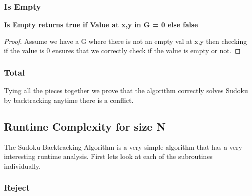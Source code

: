\documentclass{sig-alternate}
\begin{document}
\subsubsection{Is Empty}
\textbf{Is Empty returns true if Value at x,y in G = 0 else false}
\begin{proof}
Assume we have a G where there is not an empty val at x,y then checking if the value is 0 ensures that we correctly check if the value is empty or not. 
\end{proof}

\subsubsection{Total}
Tying all the pieces together we prove that the algorithm correctly solves Sudoku by backtracking anytime there is a conflict. 

\subsection{Runtime Complexity for size N}
The Sudoku Backtracking Algorithm is a very simple algorithm that has a very interesting runtime analysis. First lets look at each of the subroutines individually. 

\subsubsection{Reject}
\end{document}
